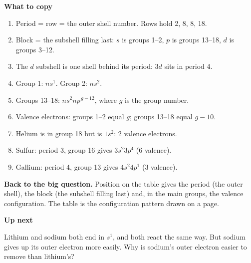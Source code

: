 \documentclass[11pt]{article}
\newcommand{\sect}[1]{\par\medskip\noindent\textbf{\large #1}\par\smallskip}
\theoremstyle{definition}\newtheorem*{example}{Example}\newtheorem*{method*}{Method}
\theoremstyle{remark}\newtheorem*{remark}{Remark}
\begin{document}
\sect{What to copy}
\begin{enumerate}[label=\textbf{Copy \arabic*.},leftmargin=4.2em,itemsep=2pt]
\item Period = row = the outer shell number. Rows hold 2, 8, 8, 18.
\item Block = the subshell filling last: $s$ is groups 1--2, $p$ is groups 13--18, $d$ is groups 3--12.
\item The $d$ subshell is one shell behind its period: $3d$ sits in period 4.
\item Group 1: $ns^{1}$. Group 2: $ns^{2}$.
\item Groups 13--18: $ns^{2}np^{\,g-12}$, where $g$ is the group number.
\item Valence electrons: groups 1--2 equal $g$; groups 13--18 equal $g-10$.
\item Helium is in group 18 but is $1s^{2}$: 2 valence electrons.
\item Sulfur: period 3, group 16 gives $3s^{2}3p^{4}$ (6 valence).
\item Gallium: period 4, group 13 gives $4s^{2}4p^{1}$ (3 valence).
\end{enumerate}
\bigskip\noindent\textbf{Back to the big question.} Position on the table gives the period (the outer shell), the block (the subshell filling last) and, in the main groups, the valence configuration. The table is the configuration pattern drawn on a page.
\sect{Up next}
Lithium and sodium both end in $s^{1}$, and both react the same way. But sodium gives up its outer electron more easily. Why is sodium's outer electron easier to remove than lithium's?
\end{document}
